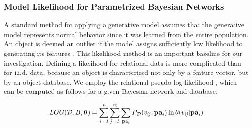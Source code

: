 \documentclass[conference]{IEEEtran}
\begin{document}
%

\subsubsection{Model Likelihood for Parametrized Bayesian Networks}

A standard method for applying a generative model assumes that the generative model represents normal behavior since it was learned from the entire population. An object is deemed an outlier if the model assigns sufficiently low likelihood to generating its features \cite{Cansado2008}. This likelihood method is an important baseline for our investigation.
Defining a likelihood for relational data is more complicated than for i.i.d. data, because an object is characterized not only by a feature vector, but by an object  database.
We employ the relational pseudo log-likelihood \cite{Schulte2011}, which can be computed as follows for a given Bayesian network  and database.


\begin{equation} \label{eq:likelihood}
\loglikelihood(\D,\model,\parameters) =   \sum_{i=1}^{n}\sum_{j=1}^{\states_{i}} \sum_{\parents_{i}}\P_{\D}(\nodevalue_{ij},\parents_{i})\ln \parameter(\nodevalue_{ij}|\parents_{i})  
\end{equation}
\end{document}
